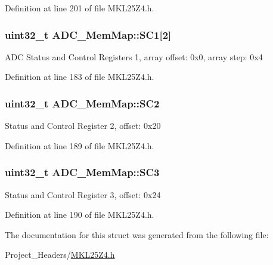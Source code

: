 Definition at line 201 of file M\+K\+L25\+Z4.\+h.

\subsubsection[{\texorpdfstring{S\+C1}{SC1}}]{\setlength{\rightskip}{0pt plus 5cm}uint32\+\_\+t A\+D\+C\+\_\+\+Mem\+Map\+::\+S\+C1\mbox{[}2\mbox{]}}\hypertarget{struct_a_d_c___mem_map_ab3900b4bfe889cd9d04850d121394741}{}\label{struct_a_d_c___mem_map_ab3900b4bfe889cd9d04850d121394741}
A\+DC Status and Control Registers 1, array offset\+: 0x0, array step\+: 0x4 

Definition at line 183 of file M\+K\+L25\+Z4.\+h.

\subsubsection[{\texorpdfstring{S\+C2}{SC2}}]{\setlength{\rightskip}{0pt plus 5cm}uint32\+\_\+t A\+D\+C\+\_\+\+Mem\+Map\+::\+S\+C2}\hypertarget{struct_a_d_c___mem_map_ad7caff2bf5e2dfb2159d174af24dc693}{}\label{struct_a_d_c___mem_map_ad7caff2bf5e2dfb2159d174af24dc693}
Status and Control Register 2, offset\+: 0x20 

Definition at line 189 of file M\+K\+L25\+Z4.\+h.

\subsubsection[{\texorpdfstring{S\+C3}{SC3}}]{\setlength{\rightskip}{0pt plus 5cm}uint32\+\_\+t A\+D\+C\+\_\+\+Mem\+Map\+::\+S\+C3}\hypertarget{struct_a_d_c___mem_map_a68295218c104f78bc2b11f04c06ce55e}{}\label{struct_a_d_c___mem_map_a68295218c104f78bc2b11f04c06ce55e}
Status and Control Register 3, offset\+: 0x24 

Definition at line 190 of file M\+K\+L25\+Z4.\+h.



The documentation for this struct was generated from the following file\+:\begin{DoxyCompactItemize}
\item 
Project\+\_\+\+Headers/\hyperlink{_m_k_l25_z4_8h}{M\+K\+L25\+Z4.\+h}\end{DoxyCompactItemize}
